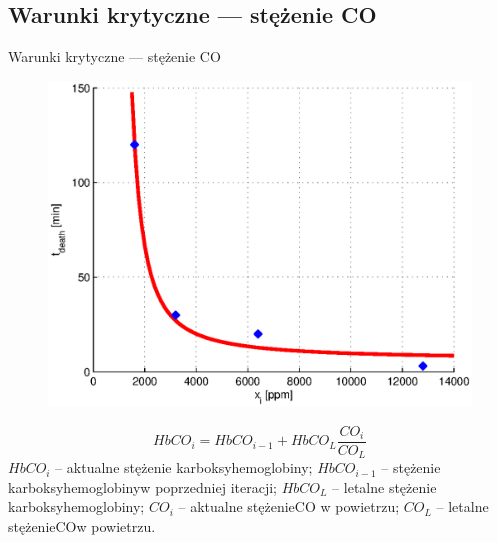 
\subsection{Warunki krytyczne --- stężenie CO}
\begin{frame}{Warunki krytyczne --- stężenie CO}
  \begin{figure}
    \centering
    \includegraphics[height=0.6\textheight]{wykresy-wiki}
  \end{figure}
  $$HbCO_i = HbCO_{i-1} + HbCO_L \frac{CO_i}{CO_L}$$
  $HbCO_i$ -- aktualne stężenie karboksyhemoglobiny;
  $HbCO_{i-1}$ -- stężenie karboksyhemoglobinyw poprzedniej iteracji;
  $HbCO_L$ -- letalne stężenie karboksyhemoglobiny;
  $CO_i$ -- aktualne stężenieCO w powietrzu;
  $CO_L$ -- letalne stężenieCOw powietrzu.
\end{frame}